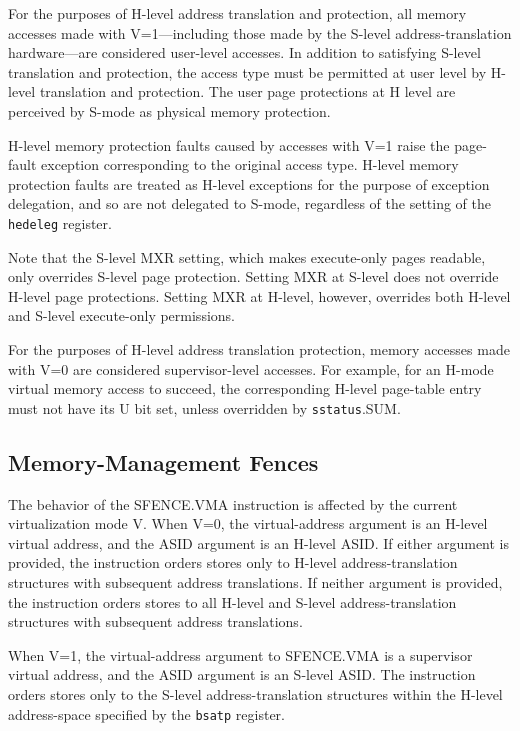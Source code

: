 For the purposes of H-level address translation and protection, all memory
accesses made with V=1---including those made by the S-level
address-translation hardware---are considered user-level accesses.  In
addition to satisfying S-level translation and protection, the access type
must be permitted at user level by H-level translation and protection.
The user page protections at H level are perceived by S-mode as physical
memory protection.

H-level memory protection faults caused by accesses with V=1 raise the
page-fault exception corresponding to the original access type.  H-level
memory protection faults are treated as H-level exceptions for the purpose of
exception delegation, and so are not delegated to S-mode, regardless of the
setting of the {\tt hedeleg} register.

Note that the S-level MXR setting, which makes execute-only pages readable,
only overrides S-level page protection.  Setting MXR at S-level does not override
H-level page protections.  Setting MXR at H-level, however, overrides
both H-level and S-level execute-only permissions.

For the purposes of H-level address translation protection, memory accesses
made with V=0 are considered supervisor-level accesses.  For example, for an
H-mode virtual memory access to succeed, the corresponding H-level page-table
entry must not have its U bit set, unless overridden by {\tt sstatus}.SUM.

\subsection{Memory-Management Fences}

The behavior of the SFENCE.VMA instruction is affected by the current
virtualization mode V.  When V=0, the virtual-address argument is an H-level
virtual address, and the ASID argument is an H-level ASID.  If either argument
is provided, the instruction orders stores only to H-level address-translation
structures with subsequent address translations.  If neither argument is
provided, the instruction orders stores to all H-level and S-level address-translation structures
with subsequent address translations.

When V=1, the virtual-address argument to SFENCE.VMA is a supervisor virtual
address, and the ASID argument is an S-level ASID.  The instruction
orders stores only to the S-level address-translation structures within the
H-level address-space specified by the {\tt bsatp} register.


